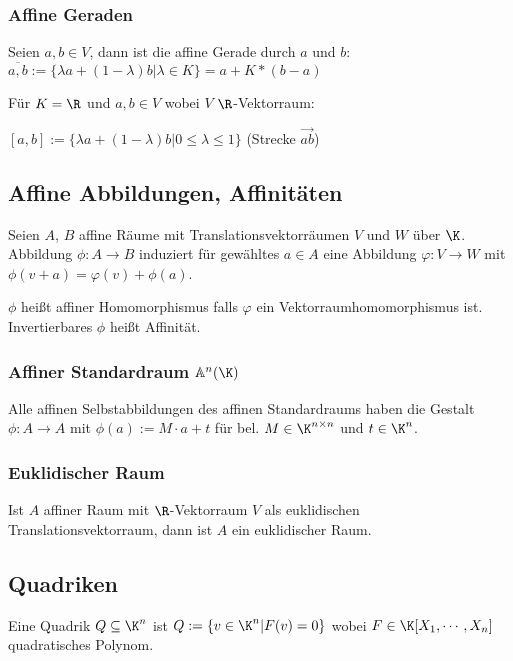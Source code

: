 \subsubsection*{Affine Geraden}

Seien $a, b \in V$, dann ist die affine Gerade durch $a$ und $b$: $\overline{a, b} := \{\lambda a + (1 - \lambda)b | \lambda \in K\} = a + K*(b-a)$

Für $K = \R$ und $a, b \in V$ wobei $V$ $\R$-Vektorraum:

$[a, b] := \{\lambda a + (1 - \lambda)b|0 \leq \lambda \leq 1\}$ (Strecke $\overrightarrow{ab}$)

\subsection*{Affine Abbildungen, Affinitäten}

Seien $A$, $B$ affine Räume mit Translationsvektorräumen $V$ und $W$ über $\K$. Abbildung $\phi : A \rightarrow B$ induziert für gewähltes $a \in A$ eine Abbildung $\varphi : V \rightarrow W$ mit $\phi(v+a) = \varphi(v) + \phi(a)$.

$\phi$ heißt affiner Homomorphismus falls $\varphi$ ein Vektorraumhomomorphismus ist. Invertierbares $\phi$ heißt Affinität.

\subsubsection*{Affiner Standardraum $\mathbb{A}^n(\K)$}

Alle affinen Selbstabbildungen des affinen Standardraums haben die Gestalt $\phi : A \rightarrow A$ mit $\phi(a) := M \cdot a + t$ für bel. $M \in \K^{n\times n}$ und $t \in \K^n$.

\subsubsection*{Euklidischer Raum}

Ist $A$ affiner Raum mit $\R$-Vektorraum $V$ als euklidischen Translationsvektorraum, dann ist $A$ ein euklidischer Raum.

\subsection*{Quadriken}

Eine Quadrik $Q \subseteq \K^n$ ist $Q := \{ v \in \K^n | F(v) = 0 \}$ wobei $F \in \K[X_1, \cdots, X_n]$ quadratisches Polynom.

